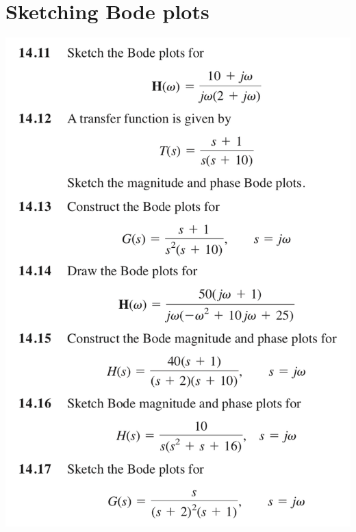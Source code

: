 \documentclass[11pt]{book}
\begin{document}
\newpage

\section{Sketching Bode plots}
\begin{center}
	\includegraphics[width=\textwidth]{figures/q3.32.png} 
\end{center}

\newpage
\end{document}

